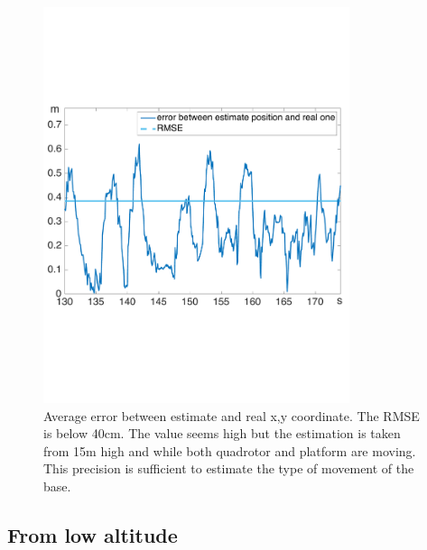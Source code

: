 \begin{figure}[!ht]
    \centering
    \includegraphics[width=0.8\textwidth]{img/high_altitude_error.pdf}
      \caption{Average error between estimate and real x,y coordinate. The RMSE is below 40cm. The value seems high but the estimation is taken from 15m high and while both quadrotor and platform are moving. This precision is sufficient to estimate the type of movement of the base.}
    \label{fig:ekf_high_altitude_error}
\end{figure}

\subsection{From low altitude}
